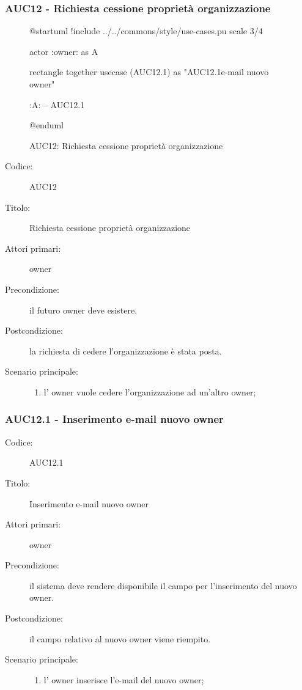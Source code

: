 \documentclass[casi-duso]{subfiles}
\begin{document}
\subsubsection{AUC12 - Richiesta cessione proprietà organizzazione}%
\label{subsub:AUC12}

\begin{figure}[h!]
  \centering
  \begin{plantuml}
  @startuml
  !include ../../commons/style/use-cases.pu
  scale 3/4

  actor :owner: as A

  rectangle {
    together {
      usecase (AUC12.1) as "AUC12.1\nInserimento e-mail nuovo owner"
    }
  }

  :A: -- AUC12.1

  @enduml
  \end{plantuml}
  \caption{AUC12: Richiesta cessione proprietà organizzazione}
  \label{fig:auc12}
\end{figure}

\begin{description}
  \item[Codice:] AUC12
  \item[Titolo:] Richiesta cessione proprietà organizzazione
  \item[Attori primari:] owner
  \item[Precondizione:] il futuro owner deve esistere.
  \item[Postcondizione:] la richiesta di cedere l'organizzazione è stata posta.
  \item[Scenario principale:]
  \begin{enumerate}
    \item l' owner vuole cedere l'organizzazione ad un'altro owner;
  \end{enumerate}
\end{description}

\subsubsection{AUC12.1 - Inserimento e-mail nuovo owner}%
\label{subsub:AUC12.1}
\begin{description}
  \item[Codice:] AUC12.1
  \item[Titolo:] Inserimento e-mail nuovo owner
  \item[Attori primari:] owner
  \item[Precondizione:] il sistema deve rendere disponibile il campo per l'inserimento del nuovo owner.
  \item[Postcondizione:] il campo relativo al nuovo owner viene riempito.
  \item[Scenario principale:]
  \begin{enumerate}
    \item l' owner inserisce l'e-mail del nuovo owner;
  \end{enumerate}
\end{description}
\end{document}

